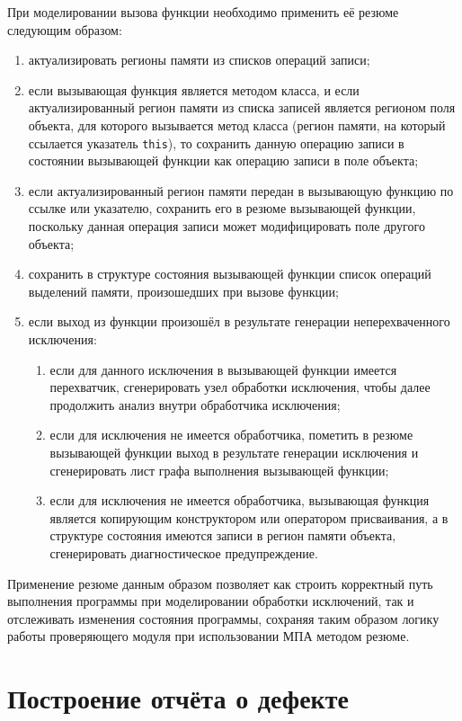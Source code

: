 При моделировании вызова функции необходимо применить её резюме следующим образом:

\begin{enumerate}
 \item актуализировать регионы памяти из списков операций записи;
 \item если вызывающая функция является методом класса, и если актуализированный регион памяти из списка записей является регионом поля объекта, для которого вызывается метод класса (регион памяти, на который ссылается указатель \texttt{this}), то сохранить данную операцию записи в состоянии вызывающей функции как операцию записи в поле объекта;
 \item если актуализированный регион памяти передан в вызывающую функцию по ссылке или указателю, сохранить его в резюме вызывающей функции, поскольку данная операция записи может модифицировать поле другого объекта;
 \item сохранить в структуре состояния вызывающей функции список операций выделений памяти, произошедших при вызове функции;
 \item если выход из функции произошёл в результате генерации неперехваченного исключения:
 \begin{enumerate}
  \item если для данного исключения в вызывающей функции имеется перехватчик, сгенерировать узел обработки исключения, чтобы далее продолжить анализ внутри обработчика исключения;
  \item если для исключения не имеется обработчика, пометить в резюме вызывающей функции выход в результате генерации исключения и сгенерировать лист графа выполнения вызывающей функции;
  \item если для исключения не имеется обработчика, вызывающая функция является копирующим конструктором или оператором присваивания, а в структуре состояния имеются записи в регион памяти объекта, сгенерировать диагностическое предупреждение.
 \end{enumerate}
\end{enumerate}

Применение резюме данным образом позволяет как строить корректный путь выполнения программы при моделировании обработки исключений, так и отслеживать изменения состояния программы, сохраняя таким образом логику работы проверяющего модуля при использовании МПА методом резюме.

\section{Построение отчёта о дефекте}

